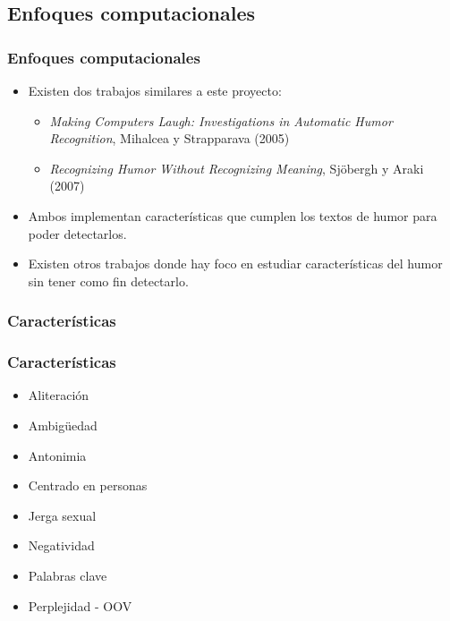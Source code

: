 \subsection{Enfoques computacionales}
\begin{frame}
    \frametitle{Enfoques computacionales}

    \begin{itemize}
        \item Existen dos trabajos similares a este proyecto:

        \begin{itemize}
            \item \emph{Making Computers Laugh: Investigations in Automatic Humor Recognition}, Mihalcea y Strapparava (2005)
            \item \emph{Recognizing Humor Without Recognizing Meaning}, Sjöbergh y Araki (2007)
        \end{itemize}

        \item Ambos implementan características que cumplen los textos de humor para poder detectarlos.

        \item Existen otros trabajos donde hay foco en estudiar características del humor sin tener como fin detectarlo.
    \end{itemize}
\end{frame}

\subsubsection{Características}

\begin{frame}
    \frametitle{Características}

    \begin{itemize}
        \item Aliteración
        \item Ambigüedad
        \item Antonimia
        \item Centrado en personas
        \item Jerga sexual
        \item Negatividad
        \item Palabras clave
        \item Perplejidad - OOV
    \end{itemize}
\end{frame}

